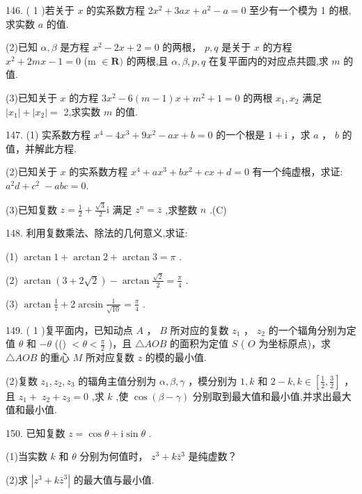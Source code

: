\documentclass[10pt]{article}
\begin{document}
146. ( 1 )若关于 \(x\) 的实系数方程 \(2{x}^{2} + {3ax} + {a}^{2} - a = 0\) 至少有一个模为 1 的根,求实数 \(a\) 的值.

(2)已知 \(\alpha ,\beta\) 是方程 \({x}^{2} - {2x} + 2 = 0\) 的两根， \(p,q\) 是关于 \(x\) 的方程 \({x}^{2} + {2mx} - 1 = 0\) (m \(\in  \mathbf{R})\) 的两根,且 \(\alpha ,\beta ,p,q\) 在复平面内的对应点共圆,求 \(m\) 的值.

(3)已知关于 \(x\) 的方程 \(3{x}^{2} - 6\left( {m - 1}\right) x + {m}^{2} + 1 = 0\) 的两根 \({x}_{1},{x}_{2}\) 满足 \(\left| {x}_{1}\right|  + \left| {x}_{2}\right|  =\) 2,求实数 \(m\) 的值.

147. (1) 实系数方程 \({x}^{4} - 4{x}^{3} + 9{x}^{2} - {ax} + b = 0\) 的一个根是 \(1 + \mathrm{i}\) ，求 \(a\) ， \(b\) 的值，并解此方程.

(2)已知关于 \(x\) 的实系数方程 \({x}^{4} + a{x}^{3} + b{x}^{2} + {cx} + d = 0\) 有一个纯虚根，求证: \({a}^{2}d + {c}^{2} \; - {abc} = 0.\)

(3)已知复数 \(z = \frac{1}{2} + \frac{\sqrt{3}}{2}\mathrm{i}\) 满足 \({z}^{n} = \bar{z}\) ,求整数 \(n\) .(C)

148. 利用复数乘法、除法的几何意义,求证:

(1) \(\arctan 1 + \arctan 2 + \arctan 3 = \pi\) .

(2) \(\arctan \left( {3 + 2\sqrt{2}}\right)  - \arctan \frac{\sqrt{2}}{2} = \frac{\pi }{4}\) .

(3) \(\arctan \frac{1}{7} + 2\arcsin \frac{1}{\sqrt{10}} = \frac{\pi }{4}\) .

149. ( 1 )复平面内，已知动点 \(A\) ， \(B\) 所对应的复数 \({z}_{1}\) ， \({z}_{2}\) 的一个辐角分别为定值 \(\theta\) 和 \(- \theta\) (() \(< \theta  < \frac{\pi }{2}\) )，且 \(\bigtriangleup  {AOB}\) 的面积为定值 \(S\) ( \(O\) 为坐标原点)，求 \(\bigtriangleup  {AOB}\) 的重心 \(M\) 所对应复数 \(z\) 的模的最小值.

(2)复数 \({z}_{1},{z}_{2},{z}_{3}\) 的辐角主值分别为 \(\alpha ,\beta ,\gamma\) ，模分别为 \(1,k\) 和 \(2 - k,k \in  \left\lbrack  {\frac{1}{2},\frac{3}{2}}\right\rbrack\) ，且 \({z}_{1} + \; {z}_{2} + {z}_{3} = 0\) ,求 \(k\) ,使 \(\cos \left( {\beta  - \gamma }\right)\) 分别取到最大值和最小值,并求出最大值和最小值.

150. 已知复数 \(z = \cos \theta  + \mathrm{i}\sin \theta\) .

(1)当实数 \(k\) 和 \(\theta\) 分别为何值时， \({z}^{3} + k{\bar{z}}^{3}\) 是纯虚数？

(2)求 \(\left| {{z}^{3} + k{\bar{z}}^{3}}\right|\) 的最大值与最小值.
\end{document}
